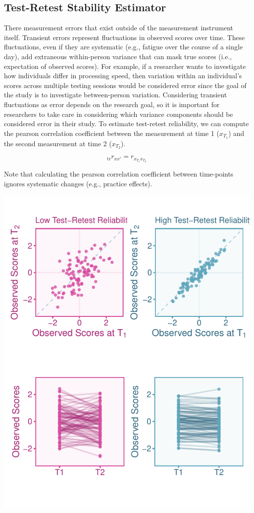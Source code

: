 \documentclass[
  letterpaper,
  DIV=11,
  numbers=noendperiod]{scrreprt}
\begin{document}
\hypertarget{test-retest-stability-estimator}{%
\subsection{Test-Retest Stability
Estimator}\label{test-retest-stability-estimator}}

There measurement errors that exist outside of the measurement
instrument itself. Transient errors represent fluctuations in observed
scores over time. These fluctuations, even if they are systematic (e.g.,
fatigue over the course of a single day), add extraneous within-person
variance that can mask true scores (i.e., expectation of observed
scores). For example, if a researcher wants to investigate how
individuals differ in processing speed, then variation within an
individual's scores across multiple testing sessions would be considered
error since the goal of the study is to investigate between-person
variation. Considering transient fluctuations as error depends on the
research goal, so it is important for researchers to take care in
considering which variance components should be considered error in
their study. To estimate test-retest reliability, we can compute the
pearson correlation coefficient between the measurement at time 1
(\(x_{T_{1}}\)) and the second measurement at time 2 (\(x_{T_{2}}\)).

\[
_\text{tr}r_{xx'}= r_{x_{T_1}x_{T_2}}
\]

Note that calculating the pearson correlation coefficient between
time-points ignores systematic changes (e.g., practice effects).

\includegraphics{unreliability_files/figure-pdf/unnamed-chunk-12-1.pdf}
\end{document}
